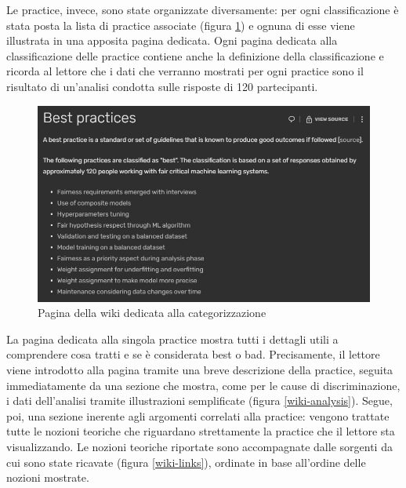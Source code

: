 Le practice, invece, sono state organizzate diversamente: per ogni classificazione è stata posta la lista di practice associate (figura \ref{wiki-prac-list}) e ognuna di esse viene illustrata in una apposita pagina dedicata. Ogni pagina dedicata alla classificazione delle practice contiene anche la definizione della classificazione e ricorda al lettore che i dati che verranno mostrati per ogni practice sono il risultato di un'analisi condotta sulle risposte di 120 partecipanti.\\

\begin{figure}[h!]
    \centering
    \includegraphics[width=420pt]{figure/catalog/best.png}
    \caption{Pagina della wiki dedicata alla categorizzazione}
    \label{wiki-prac-list}
\end{figure}

La pagina dedicata alla singola practice mostra tutti i dettagli utili a comprendere cosa tratti e se è considerata best o bad. Precisamente, il lettore viene introdotto alla pagina tramite una breve descrizione della practice, seguita immediatamente da una sezione che mostra, come per le cause di discriminazione, i dati dell'analisi tramite illustrazioni semplificate (figura \ref{wiki-analysis}). Segue, poi, una sezione inerente agli argomenti correlati alla practice: vengono trattate tutte le nozioni teoriche che riguardano strettamente la practice che il lettore sta visualizzando. Le nozioni teoriche riportate sono accompagnate dalle sorgenti da cui sono state ricavate (figura \ref{wiki-links}), ordinate in base all'ordine delle nozioni mostrate.

